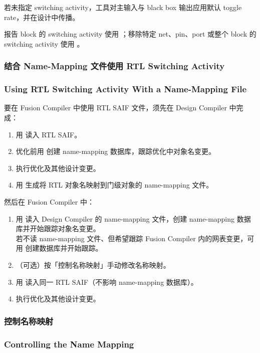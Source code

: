 若未指定 switching activity，工具对主输入与 black box 输出应用默认 toggle rate，并在设计中传播。

报告 block 的 switching activity 使用 ；移除特定 net、pin、port 或整个 block 的 switching activity 使用 。

\subsubsection{结合 Name-Mapping 文件使用 RTL Switching Activity}
\subsubsection*{Using RTL Switching Activity With a Name-Mapping File}

要在 Fusion Compiler 中使用 RTL SAIF 文件，须先在 Design Compiler 中完成：
\begin{enumerate}
  \item 用  读入 RTL SAIF。
  \item 优化前用  创建 name-mapping 数据库，跟踪优化中对象名变更。
  \item 执行优化及其他设计变更。
  \item 用  生成将 RTL 对象名映射到门级对象的 name-mapping 文件。
\end{enumerate}

然后在 Fusion Compiler 中：
\begin{enumerate}
  \item 用  读入 Design Compiler 的 name-mapping 文件，创建 name-mapping 数据库并开始跟踪对象名变更。\\
        若不读 name-mapping 文件、但希望跟踪 Fusion Compiler 内的网表变更，可用  创建数据库并开始跟踪。
  \item （可选）按「控制名称映射」手动修改名称映射。
  \item 用  读入同一 RTL SAIF（不影响 name-mapping 数据库）。
  \item 执行优化及其他设计变更。
\end{enumerate}

\subsubsection{控制名称映射}
\subsubsection*{Controlling the Name Mapping}

